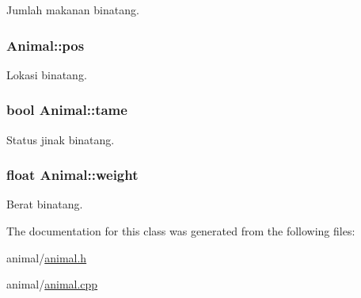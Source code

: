 Jumlah makanan binatang. 

\subsubsection[{\texorpdfstring{pos}{pos}}]{ Animal\+::pos\hspace{0.3cm}{\ttfamily [protected]}}\hypertarget{classAnimal_ae4e9a6fe53c7ebfbb00536f0e38de5c8}{}\label{classAnimal_ae4e9a6fe53c7ebfbb00536f0e38de5c8}


Lokasi binatang. 

\subsubsection[{\texorpdfstring{tame}{tame}}]{\setlength{\rightskip}{0pt plus 5cm}bool Animal\+::tame\hspace{0.3cm}{\ttfamily [protected]}}\hypertarget{classAnimal_a2f41d5123d973bd889ff9ee9d7ac6fd1}{}\label{classAnimal_a2f41d5123d973bd889ff9ee9d7ac6fd1}


Status jinak binatang. 

\subsubsection[{\texorpdfstring{weight}{weight}}]{\setlength{\rightskip}{0pt plus 5cm}float Animal\+::weight\hspace{0.3cm}{\ttfamily [protected]}}\hypertarget{classAnimal_a055c4df7dacb89eb4c2ca9bbee11ff24}{}\label{classAnimal_a055c4df7dacb89eb4c2ca9bbee11ff24}


Berat binatang. 



The documentation for this class was generated from the following files\+:\begin{DoxyCompactItemize}
\item 
animal/\hyperlink{animal_8h}{animal.\+h}\item 
animal/\hyperlink{animal_8cpp}{animal.\+cpp}\end{DoxyCompactItemize}

